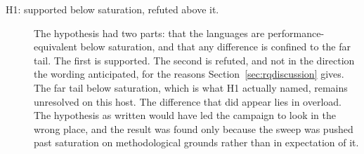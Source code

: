 \documentclass[english,oneside,a4paper,censored,csm,software-track-2020]{HYthesisML}
\begin{document}
\begin{description}
  \item[H1: supported below saturation, refuted above it.]
        The hypothesis had two parts: that the languages are performance-equivalent below
        saturation, and that any difference is confined to the far tail. The first is
        supported. The second is refuted, and not in the direction the wording anticipated,
        for the reasons Section~\ref{sec:rqdiscussion} gives. The far tail below saturation,
        which is what H1 actually named, remains unresolved on this host. The difference that
        did appear lies in overload. The hypothesis as written would have led the campaign to
        look in the wrong place, and the result was found only because the sweep was pushed
        past saturation on methodological grounds rather than in expectation of it.


\end{description}
\end{document}
